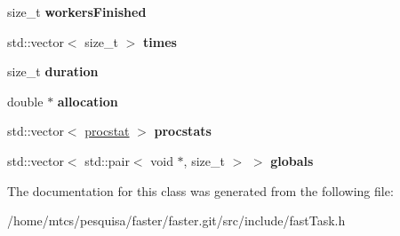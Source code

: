 \begin{DoxyCompactItemize}
\item 
\hypertarget{classfaster_1_1fastTask_a5065a797b2f5f031bde3979d664c8fd3}{}size\+\_\+t {\bfseries workers\+Finished}\label{classfaster_1_1fastTask_a5065a797b2f5f031bde3979d664c8fd3}

\item 
\hypertarget{classfaster_1_1fastTask_ad59378ade0ac559f412c726137eac964}{}std\+::vector$<$ size\+\_\+t $>$ {\bfseries times}\label{classfaster_1_1fastTask_ad59378ade0ac559f412c726137eac964}

\item 
\hypertarget{classfaster_1_1fastTask_a2b7537638f460ca40f9c539aa4950379}{}size\+\_\+t {\bfseries duration}\label{classfaster_1_1fastTask_a2b7537638f460ca40f9c539aa4950379}

\item 
\hypertarget{classfaster_1_1fastTask_add094ee3ca035539ef6ea31de93dbcce}{}double $\ast$ {\bfseries allocation}\label{classfaster_1_1fastTask_add094ee3ca035539ef6ea31de93dbcce}

\item 
\hypertarget{classfaster_1_1fastTask_aac49582ce19072b081c72492c3a819e0}{}std\+::vector$<$ \hyperlink{classfaster_1_1procstat}{procstat} $>$ {\bfseries procstats}\label{classfaster_1_1fastTask_aac49582ce19072b081c72492c3a819e0}

\item 
\hypertarget{classfaster_1_1fastTask_afadc83ba85b1b5e35b4be11968fe40c3}{}std\+::vector$<$ std\+::pair$<$ void $\ast$, size\+\_\+t $>$ $>$ {\bfseries globals}\label{classfaster_1_1fastTask_afadc83ba85b1b5e35b4be11968fe40c3}

\end{DoxyCompactItemize}


The documentation for this class was generated from the following file\+:\begin{DoxyCompactItemize}
\item 
/home/mtcs/pesquisa/faster/faster.\+git/src/include/fast\+Task.\+h\end{DoxyCompactItemize}
